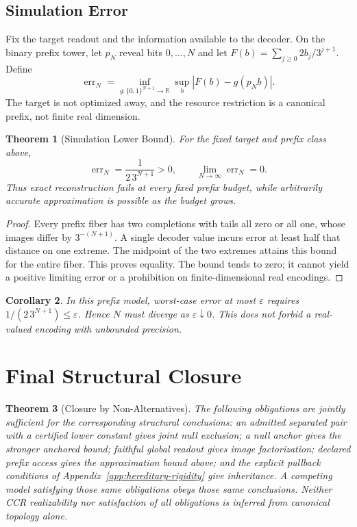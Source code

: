 \documentclass[11pt,a4paper]{article}
\theoremstyle{plain}
\newtheorem{theorem}{Theorem}[section]
\newtheorem{corollary}[theorem]{Corollary}
\theoremstyle{definition}
\theoremstyle{remark}
\begin{document}
\subsection{Simulation Error}
Fix the target readout and the information available to the decoder. On the binary prefix tower, let $p_N$ reveal bits $0,\ldots,N$ and let $F(b)=\sum_{j\geq0}2b_j/3^{j+1}$. Define
\[
\operatorname{err}_N=\inf_{g:\{0,1\}^{N+1}\to\mathbb R}\sup_b|F(b)-g(p_Nb)|.
\]
The target is not optimized away, and the resource restriction is a canonical prefix, not finite real dimension.

\begin{theorem}[Simulation Lower Bound]\label{thm:sim-cond}
For the fixed target and prefix class above,
\[
\operatorname{err}_N=\frac{1}{2\,3^{N+1}}>0,\qquad \lim_{N\to\infty}\operatorname{err}_N=0.
\]
Thus exact reconstruction fails at every fixed prefix budget, while arbitrarily accurate approximation is possible as the budget grows.
\end{theorem}

\begin{proof}
Every prefix fiber has two completions with tails all zero or all one, whose images differ by $3^{-(N+1)}$. A single decoder value incurs error at least half that distance on one extreme. The midpoint of the two extremes attains this bound for the entire fiber. This proves equality. The bound tends to zero; it cannot yield a positive limiting error or a prohibition on finite-dimensional real encodings.
\end{proof}

\begin{corollary}
In this prefix model, worst-case error at most $\varepsilon$ requires $1/(2\,3^{N+1})\leq\varepsilon$. Hence $N$ must diverge as $\varepsilon\downarrow0$. This does not forbid a real-valued encoding with unbounded precision.
\end{corollary}

\section{Final Structural Closure}

\begin{theorem}[Closure by Non-Alternatives]
The following obligations are jointly sufficient for the corresponding structural conclusions: an admitted separated pair with a certified lower constant gives joint null exclusion; a null anchor gives the stronger anchored bound; faithful global readout gives image factorization; declared prefix access gives the approximation bound above; and the explicit pullback conditions of Appendix~\ref{app:hereditary-rigidity} give inheritance. A competing model satisfying those same obligations obeys those same conclusions. Neither CCR realizability nor satisfaction of all obligations is inferred from canonical topology alone.
\end{theorem}
\end{document}
